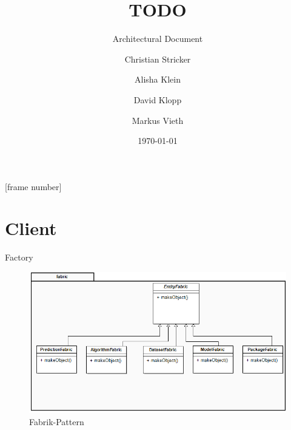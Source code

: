 \documentclass{beamer}
\title[TODO]{TODO}
\subtitle{Architectural Document}
\author[C. Stricker\and A. Klein\and D. Klopp\and M. Vieth]{Christian Stricker\and Alisha Klein\and David Klopp\and Markus Vieth}
\date[\today]{\today}
\begin{document}
	
	\frame{
		\titlepage
	}
	[frame number]
	
	
	\section{Client}
	\begin{frame}{Factory}
		\begin{figure}
			\centering
			\includegraphics[width=\linewidth]{Grafik/Klassendiagramme/fabrik}
			\caption{Fabrik-Pattern}
			\label{fig:Fabrik}
		\end{figure}
	\end{frame}
	
\end{document}
